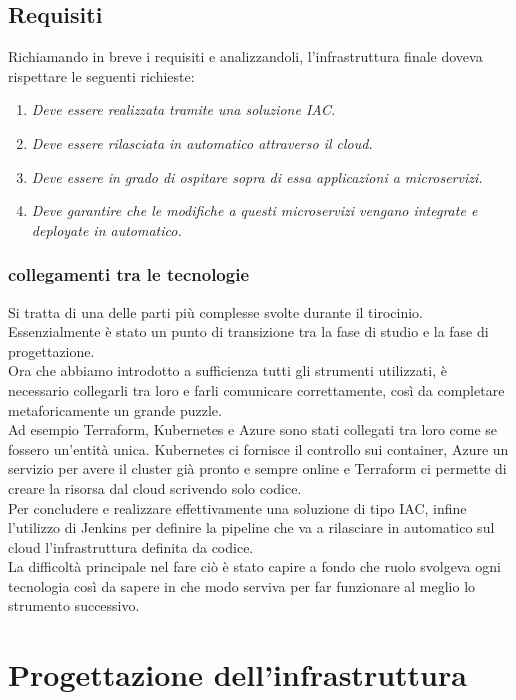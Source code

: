 \documentclass[a4paper,12pt]{report}
\begin{document}
\section{Requisiti}
Richiamando in breve i requisiti e analizzandoli, l'infrastruttura finale doveva rispettare le seguenti richieste:\\
\begin{enumerate}
\item \textit{Deve essere realizzata tramite una soluzione IAC.}
\item \textit{Deve essere rilasciata in automatico attraverso il cloud.}
\item \textit{Deve essere in grado di ospitare sopra di essa applicazioni a microservizi.}
\item \textit{Deve garantire che le modifiche a questi microservizi vengano integrate e deployate in automatico.}
\end{enumerate}
\subsection{collegamenti tra le tecnologie}
Si tratta di una delle parti più complesse svolte durante il tirocinio. Essenzialmente è stato un punto di transizione tra la fase di studio e la fase di progettazione.\\
Ora che abbiamo introdotto a sufficienza tutti gli strumenti utilizzati, è necessario collegarli tra loro e farli comunicare correttamente, così da completare metaforicamente un grande puzzle.\\
Ad esempio Terraform, Kubernetes e Azure sono stati collegati tra loro come se fossero un'entità unica. Kubernetes ci fornisce il controllo sui container, Azure un servizio per avere il cluster già pronto e sempre online e Terraform ci permette di creare la risorsa dal cloud scrivendo solo codice. \\
Per concludere e realizzare effettivamente una soluzione di tipo IAC, infine l'utilizzo di Jenkins per definire la pipeline che va a rilasciare in automatico sul cloud l'infrastruttura definita da codice.\\
La difficoltà principale nel fare ciò è stato capire a fondo che ruolo svolgeva ogni tecnologia così da sapere in che modo serviva per far funzionare al meglio lo strumento successivo.
\chapter{Progettazione dell'infrastruttura}
\end{document}
